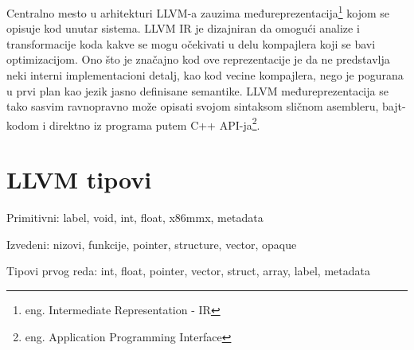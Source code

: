 Centralno mesto u arhitekturi LLVM-a\cite{aosa} zauzima međureprezentacija\footnote{eng. Intermediate Representation - IR} kojom se opisuje kod unutar sistema. LLVM IR je dizajniran da omogući analize i transformacije koda kakve se mogu očekivati u delu kompajlera koji se bavi optimizacijom. Ono što je značajno kod ove reprezentacije je da ne predstavlja neki interni implementacioni detalj, kao kod vecine kompajlera, nego je pogurana u prvi plan kao jezik jasno definisane semantike. LLVM međureprezentacija se tako sasvim ravnopravno može opisati svojom sintaksom sličnom asembleru, bajt-kodom i direktno iz programa putem C++ API-ja\footnote{eng. Application Programming Interface}.



\section{LLVM tipovi}

Primitivni: label, void, int, float, x86mmx, metadata

Izvedeni: nizovi, funkcije, pointer, structure, vector, opaque

Tipovi prvog reda: int, float, pointer, vector, struct, array, label, metadata


